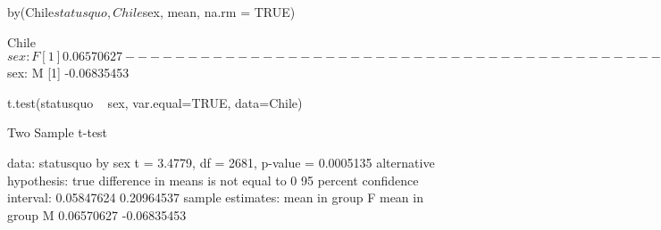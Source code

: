\begin{Schunk}
\begin{Sinput}
 by(Chile$statusquo, Chile$sex, mean, na.rm = TRUE)
\end{Sinput}
\begin{Soutput}
Chile$sex: F
[1] 0.06570627
------------------------------------------------------------------------------------------------------------------------ 
Chile$sex: M
[1] -0.06835453
\end{Soutput}
\begin{Sinput}
 t.test(statusquo ~ sex, var.equal=TRUE, data=Chile) 
\end{Sinput}
\begin{Soutput}
	Two Sample t-test

data:  statusquo by sex
t = 3.4779, df = 2681, p-value = 0.0005135
alternative hypothesis: true difference in means is not equal to 0
95 percent confidence interval:
 0.05847624 0.20964537
sample estimates:
mean in group F mean in group M 
     0.06570627     -0.06835453 
\end{Soutput}
\end{Schunk}
